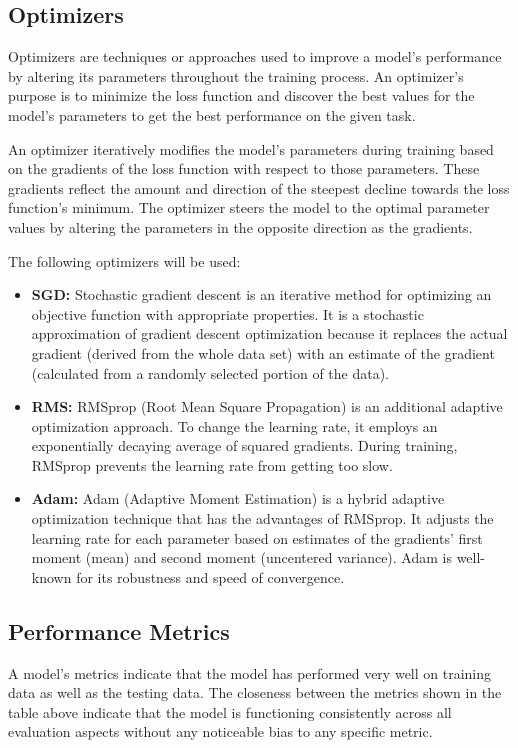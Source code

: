 \documentclass[a4paper,twoside,10pt]{article}
\begin{document}
\subsection{Optimizers}
Optimizers are techniques or approaches used to improve a model's performance by altering its parameters throughout the training process. An optimizer's purpose is to minimize the loss function and discover the best values for the model's parameters to get the best performance on the given task.

An optimizer iteratively modifies the model's parameters during training based on the gradients of the loss function with respect to those parameters. These gradients reflect the amount and direction of the steepest decline towards the loss function's minimum. The optimizer steers the model to the optimal parameter values by altering the parameters in the opposite direction as the gradients.

The following optimizers will be used:
\begin{itemize}
    \item \textbf{SGD:} Stochastic gradient descent is an iterative method for optimizing an objective function with appropriate properties. It is a stochastic approximation of gradient descent optimization because it replaces the actual gradient (derived from the whole data set) with an estimate of the gradient (calculated from a randomly selected portion of the data).

    \item \textbf{RMS:} RMSprop (Root Mean Square Propagation) is an additional adaptive optimization approach. To change the learning rate, it employs an exponentially decaying average of squared gradients. During training, RMSprop prevents the learning rate from getting too slow.

    \item \textbf {Adam:} Adam (Adaptive Moment Estimation) is a hybrid adaptive optimization technique that has the advantages of RMSprop. It adjusts the learning rate for each parameter based on estimates of the gradients' first moment (mean) and second moment (uncentered variance). Adam is well-known for its robustness and speed of convergence.
\end{itemize}

\subsection{Performance Metrics}
A model's metrics indicate that the model has performed very well on training data as well as the testing data. The closeness between the metrics shown in the table above indicate that the model is functioning consistently across all evaluation aspects without any noticeable bias to any specific metric.
\end{document}

